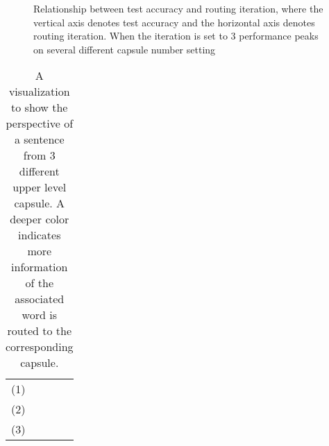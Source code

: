 \documentclass[11pt]{article}
\begin{document}
\begin{figure}[t]\centering
  \pgfplotsset{width=0.5\textwidth}
\caption{Relationship between test accuracy and routing iteration, where the vertical axis denotes test accuracy and the horizontal axis denotes routing iteration. When the iteration is set to 3 performance peaks on several different capsule number setting}


\label{fig:capsiter}
\end{figure}

\begin{table}[t] \setlength{\tabcolsep}{10pt}
\begin{center}
\begin{tabular}{l}
\toprule
(1) \color{blue!17.11!white}{so} \color{blue!39.94!white}{relentlessly} \color{blue!21.96!white}{wholesome} \color{blue!28.90!white}{it} \color{blue!26.95!white}{made} \color{blue!28.46!white}{me} \color{blue!27.17!white}{want} \color{blue!13.36!white}{to} \color{blue!20.76!white}{swipe} \color{blue!10.81!white}{something} \color{blue!11.06!white}{.}\\
(2) \color{blue!51.46!white}{so} \color{blue!11.71!white}{relentlessly} \color{blue!14.31!white}{wholesome} \color{blue!33.77!white}{it} \color{blue!49.26!white}{made} \color{blue!54.32!white}{me} \color{blue!73.28!white}{want} \color{blue!94.33!white}{to} \color{blue!81.99!white}{swipe} \color{blue!98.31!white}{something} \color{blue!98.42!white}{.}\\
(3) \color{blue!51.43!white}{so} \color{blue!80.35!white}{relentlessly} \color{blue!83.73!white}{wholesome} \color{blue!57.32!white}{it} \color{blue!43.79!white}{made} \color{blue!37.22!white}{me} \color{blue!19.55!white}{want} \color{blue!12.31!white}{to} \color{blue!17.25!white}{swipe} \color{blue!10.88!white}{something} \color{blue!10.52!white}{.}\\
\bottomrule
\end{tabular}
\end{center}
\caption{A visualization to show the perspective of a sentence from 3 different upper level capsule. A deeper color indicates more information of the associated word is routed to the corresponding capsule.}
\label{tab:weight_visual}
\end{table}
\end{document}
